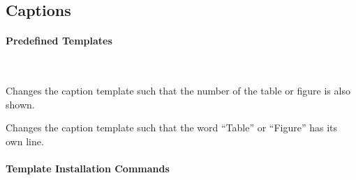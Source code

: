 








\subsection{Captions}
\label{section-template-caption}

\paragraph{Predefined Templates}\

\begin{command}{\beamertemplatecaptionwithnumber}
  Changes the caption template such that the number of the
  table or figure is also shown.
\end{command}

\begin{command}{\beamertemplatecaptionownline}
  Changes the caption template such that the word ``Table''
  or ``Figure'' has its own line.
\end{command}



\paragraph{Template Installation Commands}\

